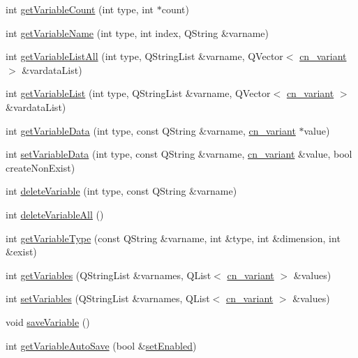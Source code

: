 \begin{DoxyCompactItemize}
\item 
int \hyperlink{classCUIApp_af7fb38556ebd9cb1dab1c054170f9918}{get\-Variable\-Count} (int type, int $\ast$count)
\item 
int \hyperlink{classCUIApp_ae70f81bcbc00de588c4c50d1b556da10}{get\-Variable\-Name} (int type, int index, Q\-String \&varname)
\item 
int \hyperlink{classCUIApp_a925db4d1b2bbd1afb9444c0e0107e8b0}{get\-Variable\-List\-All} (int type, Q\-String\-List \&varname, Q\-Vector$<$ \hyperlink{structcn__variant}{cn\-\_\-variant} $>$ \&vardata\-List)
\item 
int \hyperlink{classCUIApp_aa91bb1b3ee8cd64c045070501febc093}{get\-Variable\-List} (int type, Q\-String\-List \&varname, Q\-Vector$<$ \hyperlink{structcn__variant}{cn\-\_\-variant} $>$ \&vardata\-List)
\item 
int \hyperlink{classCUIApp_a2e1f43703c1671c83597eb4c49fcdb84}{get\-Variable\-Data} (int type, const Q\-String \&varname, \hyperlink{structcn__variant}{cn\-\_\-variant} $\ast$value)
\item 
int \hyperlink{classCUIApp_a1278c6736ec4e320ded37fcf47c7f947}{set\-Variable\-Data} (int type, const Q\-String \&varname, \hyperlink{structcn__variant}{cn\-\_\-variant} \&value, bool create\-Non\-Exist)
\item 
int \hyperlink{classCUIApp_ab3516417e2cea5be658322391350312e}{delete\-Variable} (int type, const Q\-String \&varname)
\item 
int \hyperlink{classCUIApp_ad515e95f6925fb50d6945baee291b017}{delete\-Variable\-All} ()
\item 
int \hyperlink{classCUIApp_aa79bafb099375e6dd3abc597282a5637}{get\-Variable\-Type} (const Q\-String \&varname, int \&type, int \&dimension, int \&exist)
\item 
int \hyperlink{classCUIApp_af85b9d32033d3eb9fccf453d074e3be8}{get\-Variables} (Q\-String\-List \&varnames, Q\-List$<$ \hyperlink{structcn__variant}{cn\-\_\-variant} $>$ \&values)
\item 
int \hyperlink{classCUIApp_aa8642ecf51f34f93073e5708586ad56c}{set\-Variables} (Q\-String\-List \&varnames, Q\-List$<$ \hyperlink{structcn__variant}{cn\-\_\-variant} $>$ \&values)
\item 
void \hyperlink{classCUIApp_ad06f7d4fe267316a5f408b20b380fc3e}{save\-Variable} ()
\item 
int \hyperlink{classCUIApp_ac406cc3f26f1b415e145cd0bee60b46e}{get\-Variable\-Auto\-Save} (bool \&\hyperlink{classCUIApp_a0bb9aaecc950f991d3ecc69e5895e9e6}{set\-Enabled})

\end{DoxyCompactItemize}
